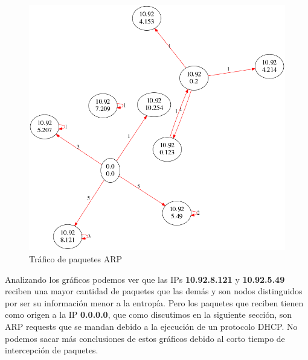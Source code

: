 \begin{figure}[H]
       \centering
       \includegraphics[width=1\textwidth]{../resultados/subte/network.png}
       \caption{Tráfico de paquetes ARP}
       \label{red-Starbucks-dst-information}
\end{figure}

Analizando los gráficos podemos ver que las IPs \textbf{10.92.8.121} y \textbf{10.92.5.49} reciben una mayor cantidad de paquetes que las demás y son nodos distinguidos por ser su información menor a la entropía. Pero los paquetes que reciben tienen como origen a la IP \textbf{0.0.0.0}, que como discutimos en la siguiente sección, son ARP requests que se mandan debido a la ejecución de un protocolo DHCP. No podemos sacar más conclusiones de estos gráficos debido al corto tiempo de intercepción de paquetes.\\